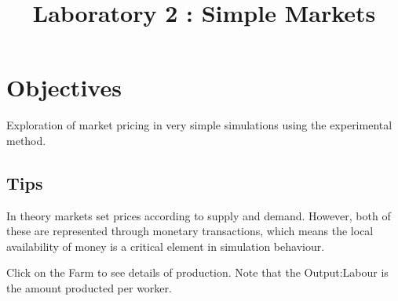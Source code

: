 \documentclass{article}
\title{Laboratory 2 : Simple Markets}
\begin{document}
\date{}
\maketitle %



\section*{\centering Objectives}
Exploration of market pricing in very simple simulations using the
experimental method.

\subsection*{Tips}
In theory markets set prices according to supply and demand. However,
both of these are represented through monetary transactions, which
means the local availability of money is a critical element in 
simulation behaviour.

Click on the Farm to see details of production. Note that the Output:Labour is the amount producted per worker.


 
\end{document}
